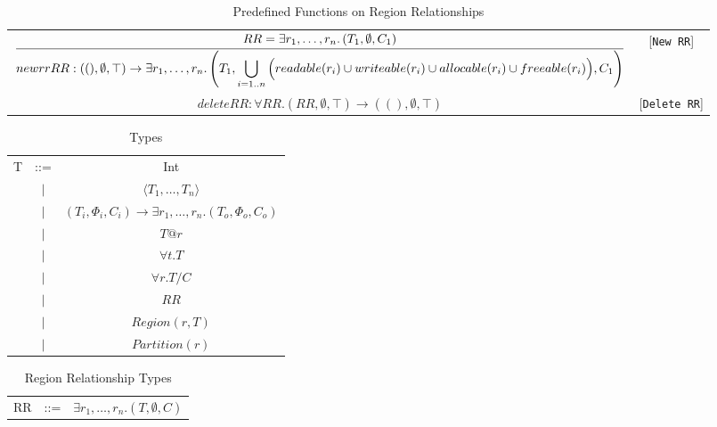 \documentclass{article}
\newcommand{\infrule}[2]{\displaystyle\frac{\displaystyle\strut{#1}}{\displaystyle\strut {#2}}}
\newcommand{\rtriple}[3]{\left({#1},{#2},{#3}\right)}
\newcommand{\rsingle}[1]{\rtriple{#1}{\emptyset}{\top}}
\newcommand{\rtripsub}[3]{\rtriple{#1}{\Phi_{#2}}{C_{#3}}}
\begin{document}
\begin{table*}
\centering
{\small
\begin{tabular}{cc}

%
%
\begin{math}
\infrule{
  RR = \exists r_1, \ldots, r_n. \rtriple{T_1}{\emptyset}{C_1}
}{
  newrr RR : \rsingle{()} \rightarrow \exists r_1, \ldots, r_n. \rtriple{T_1}{\bigcup_{i = 1..n} \Big( readable(r_i) \cup writeable(r_i) \cup allocable(r_i) \cup freeable(r_i) \Big)}{C_1}
}
\end{math} & [{\tt New RR}] \\

%
%
\begin{math}
deleteRR : \forall RR. \rsingle{RR} \rightarrow \rsingle{()}
\end{math} & [{\tt Delete RR}] \\
\end{tabular}
}
\caption{Predefined Functions on Region Relationships}
\end{table*}

\begin{table*}
\centering
{\small
\begin{tabular}{ccc}

T & ::= & Int \\
  &$\mid$&$\langle T_1, \ldots, T_n \rangle$ \\
  &$\mid$&$\rtripsub{T_i}{i}{i} \rightarrow \exists r_1, \ldots, r_n.\rtripsub{T_o}{o}{o}$ \\
  &$\mid$&$T@r$\\
  &$\mid$&$\forall t.T$ \\
  &$\mid$&$\forall r.T/C$ \\
  &$\mid$&$RR$ \\
  &$\mid$&$Region(r,T)$ \\
  &$\mid$&$Partition(r)$ \\

\end{tabular}
}
\caption{Types}
\end{table*}

\begin{table*}
\centering
{\small
\begin{tabular}{ccc}
RR & ::= & $\exists r_1, \ldots, r_n.\rtriple{T}{\emptyset}{C}$ \\
\end{tabular}
}
\caption{Region Relationship Types}
\end{table*}
\end{document}
